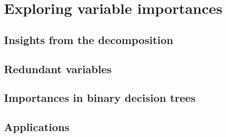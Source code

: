\chapter{Exploring variable importances}\label{ch:applications}

\section{Insights from the decomposition}



\section{Redundant variables}




\section{Importances in binary decision trees}




%


\section{Applications}

